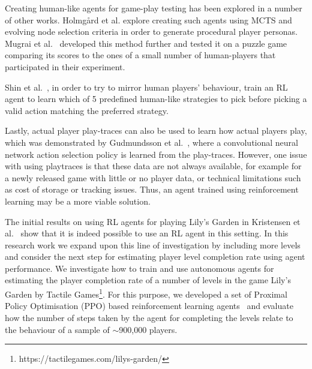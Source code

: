 \documentclass[conference]{IEEEtran}
\begin{document}



Creating human-like agents for game-play testing has been explored in a number of other works.
Holmgård et al.\cite{Holmgard2018} explore creating such agents using MCTS and evolving node selection criteria in order to generate procedural player personas. Mugrai et al.~\cite{Mugrai2019AutomatedGames} developed this method further and tested it on a puzzle game comparing its scores to the ones of a small number of human-players that participated in their experiment.

Shin et al.~\cite{Shin2020PlaytestingLearning}, in order to try to mirror human players' behaviour, train an RL agent to learn which of 5 predefined human-like strategies to pick before picking a valid action matching the preferred strategy.

Lastly, actual player play-traces can also be used to learn how actual players play, which was demonstrated by Gudmundsson et al.~\cite{Gudmundsson2017}, where a convolutional neural network action selection policy is learned from the play-traces.
However, one issue with using playtraces is that these data are not always available, for example for a newly released game with little or no player data, or technical limitations such as cost of storage or tracking issues.
Thus, an agent trained using reinforcement learning may be a more viable solution.


The initial results on using RL agents for playing Lily's Garden in Kristensen et al.~\cite{Kristensen2020StrategiesGames} show that it is indeed possible to use an RL agent in this setting.
In this research work we expand upon this line of investigation by including more levels and consider the next step for estimating player level completion rate using agent performance.
We investigate how to train and use autonomous agents for estimating the player completion rate of a number of levels in the game Lily's Garden by Tactile Games\footnote{https://tactilegames.com/lilys-garden/}.
For this purpose, we developed a set of Proximal Policy Optimisation (PPO) based reinforcement learning agents~\cite{Schulman2017} and evaluate how the number of steps taken by the agent for completing the levels relate to the behaviour of a sample of $\sim$900,000 players.
\end{document}
